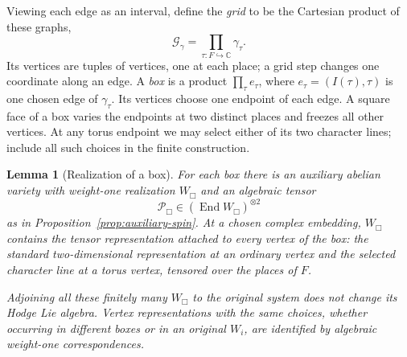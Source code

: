 \documentclass[11pt]{article}
\numberwithin{equation}{section}
\newtheorem{lemma}[theorem]{Lemma}
\theoremstyle{definition}
\theoremstyle{remark}
\begin{document}
Viewing each edge as an interval, define the \emph{grid} to be the
Cartesian product of these graphs,
\[
 \mathscr G_\gamma=
       \prod_{\tau:F\hookrightarrow\mathbb C}\gamma_\tau.
\]
Its vertices are tuples of vertices, one at each place; a grid step
changes one coordinate along an edge.  A \emph{box} is a product
\(\prod_\tau e_\tau\), where $e_\tau=(I(\tau),\tau)$ is one
chosen edge of $\gamma_\tau$.  Its vertices choose one endpoint of
each edge.  A square face of a box varies the endpoints at two distinct
places and freezes all other vertices.  At any torus endpoint we may
select either of its two character lines; include all such choices in
the finite construction.

\begin{lemma}[Realization of a box]\label{lem:mixed-box}
For each box there is an auxiliary abelian variety with weight-one
realization $W_{\Box}$ and an algebraic tensor
\[
 \mathcal P_{\Box}\in(\operatorname{End} W_{\Box})^{\otimes2}
\]
as in Proposition~\ref{prop:auxiliary-spin}.  At a chosen complex
embedding, $W_{\Box}$ contains the tensor representation attached
to every vertex of the box: the standard two-dimensional representation
at an ordinary vertex and the selected character line at a torus
vertex, tensored over the places of $F$.

Adjoining all these finitely many $W_{\Box}$ to the original system
does not change its Hodge Lie algebra.  Vertex representations with
the same choices, whether occurring in different boxes or in an
original $W_i$, are identified by algebraic weight-one correspondences.
\end{lemma}
\end{document}
